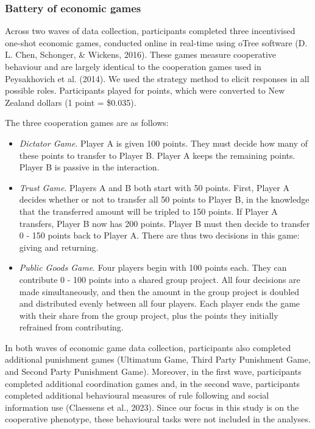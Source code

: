 \documentclass[
  man,floatsintext]{apa6}
\providecommand{\tightlist}{%
  \setlength{\itemsep}{0pt}\setlength{\parskip}{0pt}}
\begin{document}
\hypertarget{battery-of-economic-games}{%
\subsubsection{Battery of economic games}\label{battery-of-economic-games}}

Across two waves of data collection, participants completed three incentivised one-shot economic games, conducted online in real-time using oTree software (D. L. Chen, Schonger, \& Wickens, 2016). These games measure cooperative behaviour and are largely identical to the cooperation games used in Peysakhovich et al. (2014). We used the strategy method to elicit responses in all possible roles. Participants played for points, which were converted to New Zealand dollars (1 point = \$0.035).

The three cooperation games are as follows:

\begin{itemize}
\tightlist
\item
  \emph{Dictator Game}. Player A is given 100 points. They must decide how many of these points to transfer to Player B. Player A keeps the remaining points. Player B is passive in the interaction.
\item
  \emph{Trust Game}. Players A and B both start with 50 points. First, Player A decides whether or not to transfer all 50 points to Player B, in the knowledge that the transferred amount will be tripled to 150 points. If Player A transfers, Player B now has 200 points. Player B must then decide to transfer 0 - 150 points back to Player A. There are thus two decisions in this game: giving and returning.
\item
  \emph{Public Goods Game}. Four players begin with 100 points each. They can contribute 0 - 100 points into a shared group project. All four decisions are made simultaneously, and then the amount in the group project is doubled and distributed evenly between all four players. Each player ends the game with their share from the group project, plus the points they initially refrained from contributing.
\end{itemize}

In both waves of economic game data collection, participants also completed additional punishment games (Ultimatum Game, Third Party Punishment Game, and Second Party Punishment Game). Moreover, in the first wave, participants completed additional coordination games and, in the second wave, participants completed additional behavioural measures of rule following and social information use (Claessens et al., 2023). Since our focus in this study is on the cooperative phenotype, these behavioural tasks were not included in the analyses.
\end{document}
